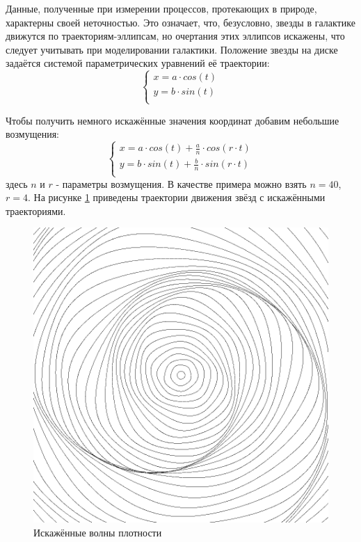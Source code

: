 Данные, полученные при измерении процессов, протекающих в природе, характерны своей неточностью. Это означает, что, безусловно, звезды в галактике движутся по траекториям-эллипсам, но очертания этих эллипсов искажены, что следует учитывать при моделировании галактики. Положение звезды на диске задаётся системой параметрических уравнений её траектории:
\begin{equation}
    \left\{ \begin{array}{ll}

        x = a \cdot{} cos(t) \\
        y = b \cdot{} sin(t) \\

    \end{array} \right.
\end{equation}

Чтобы получить немного искажённые значения координат добавим небольшие возмущения:
\begin{equation}
    \left\{ \begin{array}{ll}

        x = a \cdot{} cos(t) + \frac{a}{n} \cdot{} cos(r \cdot{} t) \\
        y = b \cdot{} sin(t) + \frac{b}{n} \cdot{} sin(r \cdot{} t) \\

    \end{array} \right.
\end{equation}
здесь $n$ и $r$ - параметры возмущения. В качестве примера можно взять $n = 40$, $r = 4$. На рисунке \ref{img:densitywaves_analog} приведены траектории движения звёзд с искажёнными траекториями.
\begin{figure}[H]
    \centering
	\includegraphics[scale=0.4]{image/densitywaves_analog.png}
	\caption{Искажённые волны плотности}
	\label{img:densitywaves_analog}
\end{figure}


